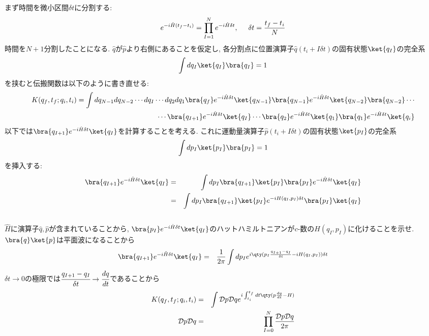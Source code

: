 \documentclass[10.5pt,a4paper]{jreport}
\begin{document}
まず時間を微小区間$\delta t$に分割する:
\begin{eqnarray}
  e^{-i\hat{H}(t_f-t_i)} = \prod_{I=1}^Ne^{-i\hat{H}\delta t},\hspace{0.5cm} \delta t = \frac{t_f - t_i}{N}
\end{eqnarray}
時間を$N+1$分割したことになる. $\hat{q}$が$\hat{p}$より右側にあることを仮定し, 各分割点に位置演算子$\hat{q}(t_i + I\delta t)$の固有状態$\ket{q_I}$の完全系
\begin{eqnarray}
  \int dq_I \ket{q_I}\bra{q_I} = 1
\end{eqnarray}
を挟むと伝搬関数は以下のように書き直せる:
\begin{eqnarray}
  \nonumber  K(q_f, t_f;q_i, t_i) =\int dq_{N-1}dq_{N-2}\cdots dq_{I}\cdots dq_2dq_1\bra{q_f}e^{-i\hat{H}\delta t}\ket{q_{N-1}}\bra{q_{N-1}}e^{-i\hat{H}\delta t}\ket{q_{N-2}}\bra{q_{N-2}}\cdots\\
  \cdots\bra{q_{I+1}}e^{-i\hat{H}\delta t}\ket{q_{I}}\cdots\bra{q_2}e^{-i\hat{H}\delta t}\ket{q_1}\bra{q_1}e^{-i\hat{H}\delta t}\ket{q_i}
\end{eqnarray}
以下では$\bra{q_{I+1}}e^{-i\hat{H}\delta t}\ket{q_{I}}$を計算することを考える. これに運動量演算子$\hat{p}(t_i + I\delta t)$の固有状態$\ket{p_I}$の完全系
\begin{eqnarray}
  \int dp_I \ket{p_I}\bra{p_I} = 1
\end{eqnarray}
を挿入する:
\begin{eqnarray}
  \bra{q_{I+1}}e^{-i\hat{H}\delta t}\ket{q_{I}} &=& \int dp_I\bra{q_{I+1}}\ket{p_I}\bra{p_I}e^{-i\hat{H}\delta t}\ket{q_{I}}\\
  &=&\int dp_I\bra{q_{I+1}}\ket{p_I}e^{-iH(q_I, p_I)\delta t}\bra{p_I}\ket{q_{I}}
\end{eqnarray}\\

 $\hat{H}$に演算子$\hat{q}, \hat{p}$が含まれていることから, $\bra{p_I}e^{-i\hat{H}\delta t}\ket{q_{I}}$のハットハミルトニアンが$c$-数の$H(q_I, p_I)$に化けることを示せ.\\

$\bra{q}\ket{p}$は平面波になることから
\begin{eqnarray}
  \bra{q_{I+1}}e^{-i\hat{H}\delta t}\ket{q_{I}} &=& \frac{1}{2\pi}\int dp_Ie^{i\qty(p_I\frac{q_{I+1}-q_I}{\delta t}-iH(q_I, p_I)){\delta t}}
\end{eqnarray}
$\delta t \rightarrow 0$の極限では$\cfrac{q_{I+1}-q_I}{\delta t}\rightarrow \cfrac{dq}{dt}$であることから
\begin{eqnarray}
  K(q_f, t_f;q_i, t_i) &=& \int {\cal D}p{\cal D}qe^{i\int_{t_i}^{t_f}dt\qty(p\frac{dq}{dt} - H)}\\
  {\cal D}p{\cal D}q &=& \prod_{I=0}^{N}\frac{{\cal D}p{\cal D}q}{2\pi}
\end{eqnarray}\\
\end{document}
